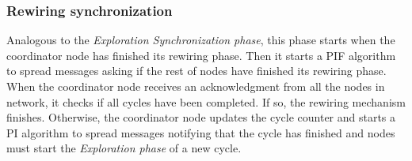 \subsubsection{Rewiring synchronization}

Analogous to the \textit{Exploration Synchronization phase}, this phase starts when the coordinator node has finished its rewiring phase. Then it starts a PIF algorithm to spread messages asking if the rest of nodes have finished its rewiring phase. When the coordinator node receives an acknowledgment from all the nodes in network, it checks if all cycles have been completed. If so, the rewiring mechanism finishes. Otherwise, the coordinator node updates the cycle counter and starts a PI algorithm to spread messages notifying that the cycle has finished and nodes must start the \textit{Exploration phase} of a new cycle.
